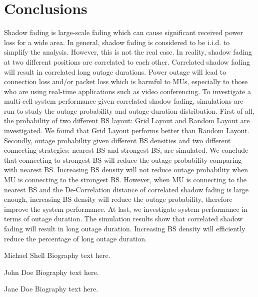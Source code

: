 \documentclass[journal,comsoc]{IEEEtran}
\begin{document}
\section{Conclusions}
\label{Conclusion}
Shadow fading is large-scale fading which can cause significant received power loss for a wide area. In general, shadow fading is considered to be i.i.d. to simplify the analysis. However, this is not the real case. In reality, shadow fading at two different positions are correlated to each other. Correlated shadow fading will result in correlated long outage durations. Power outage will lead to connection loss and/or packet loss which is harmful to MUs, especially to those who are using real-time applications such as video conferencing. To investigate a multi-cell system performance given correlated shadow fading, simulations are run to study the outage probability and outage duration distribution. First of all, the probability of two different BS layout: Grid Layout and Random Layout are investigated. We found that Grid Layout performs better than Random Layout. Secondly, outage probability given different BS densities and two different connecting strategies: nearest BS and strongest BS, are simulated. We conclude that connecting to strongest BS will reduce the outage probability comparing with nearest BS. Increasing BS density will not reduce outage probability when MU is connecting to the strongest BS. However, when MU is connecting to the nearest BS and the De-Correlation distance of correlated shadow fading is large enough, increasing BS density will reduce the outage probability, therefore improve the system performance. At last, we investigate system performance in terms of outage duration. The simulation results show that correlated shadow fading will result in long outage duration. Increasing BS density will efficiently reduce the percentage of long outage duration.





\begin{IEEEbiography}{Michael Shell}
Biography text here.
\end{IEEEbiography}

\begin{IEEEbiographynophoto}{John Doe}
Biography text here.
\end{IEEEbiographynophoto}


\begin{IEEEbiographynophoto}{Jane Doe}
Biography text here.
\end{IEEEbiographynophoto}
\end{document}
